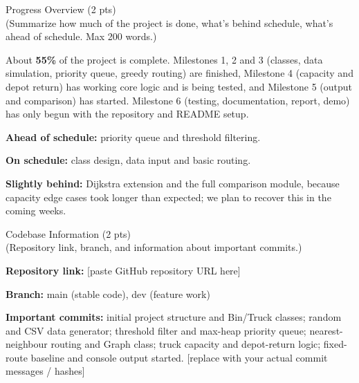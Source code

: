 \documentclass[10pt,a4paper]{article}
\newcommand{\sectionhead}[2]{%
  \needspace{8\baselineskip}
  \vspace{6pt}
  {\Large\color{headblue}#1}\\[-2pt]
  {\small\color{hintgrey}#2}\par\vspace{2pt}}
\begin{document}
\sectionhead{Progress Overview (2 pts)}{(Summarize how much of the project is done, what's behind schedule, what's ahead of schedule. Max 200 words.)}
\begin{answerbox}
About \textbf{55\%} of the project is complete. Milestones 1, 2 and 3 (classes, data simulation, priority queue, greedy routing) are finished, Milestone 4 (capacity and depot return) has working core logic and is being tested, and Milestone 5 (output and comparison) has started. Milestone 6 (testing, documentation, report, demo) has only begun with the repository and README setup.

\textbf{Ahead of schedule:} priority queue and threshold filtering.

\textbf{On schedule:} class design, data input and basic routing.

\textbf{Slightly behind:} Dijkstra extension and the full comparison module, because capacity edge cases took longer than expected; we plan to recover this in the coming weeks.
\end{answerbox}

\sectionhead{Codebase Information (2 pts)}{(Repository link, branch, and information about important commits.)}
\begin{answerbox}
\textbf{Repository link:} [paste GitHub repository URL here]

\textbf{Branch:} main (stable code), dev (feature work)

\textbf{Important commits:} initial project structure and Bin/Truck classes; random and CSV data generator; threshold filter and max-heap priority queue; nearest-neighbour routing and Graph class; truck capacity and depot-return logic; fixed-route baseline and console output started. [replace with your actual commit messages / hashes]
\end{answerbox}
\end{document}
